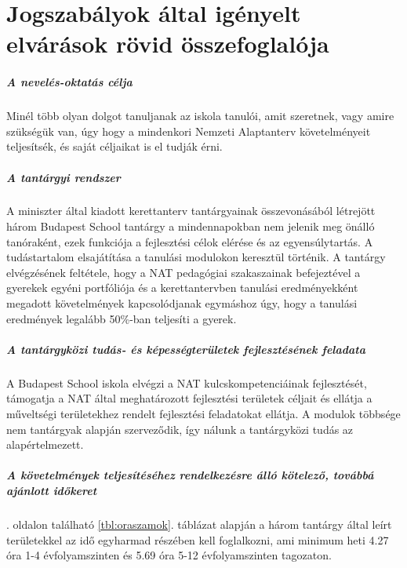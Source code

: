\chapter{Jogszabályok által igényelt elvárások rövid összefoglalója}
\label{sec:jogszabalyok}
\paragraph{A nevelés-oktatás célja}

Minél több olyan dolgot tanuljanak az iskola tanulói, amit szeretnek, vagy
amire szükségük van, úgy hogy a mindenkori Nemzeti Alaptanterv követelményeit
teljesítsék, és saját céljaikat is el tudják érni.

\paragraph{A tantárgyi rendszer}

A miniszter által kiadott kerettanterv tantárgyainak összevonásából létrejött
három Budapest School tantárgy a mindennapokban nem jelenik meg önálló
tanóraként, ezek funkciója a fejlesztési célok elérése és az egyensúlytartás. A
tudástartalom elsajátítása a tanulási modulokon keresztül történik. A tantárgy
elvégzésének feltétele, hogy a NAT pedagógiai szakaszainak befejeztével a
gyerekek egyéni portfóliója és a kerettantervben tanulási eredményekként
megadott követelmények kapcsolódjanak
egymáshoz úgy, hogy a tanulási eredmények legalább 50\%-ban teljesíti a gyerek.

\paragraph{A tantárgyközi tudás- és képességterületek fejlesztésének feladata}

A Budapest School iskola elvégzi a NAT kulcskompetenciáinak
fejlesztését, támogatja a NAT által meghatározott fejlesztési területek céljait
és ellátja a műveltségi területekhez rendelt fejlesztési feladatokat ellátja.
A modulok többsége nem tantárgyak alapján szerveződik, így nálunk a
tantárgyközi tudás az alapértelmezett.

\paragraph{A követelmények teljesítéséhez rendelkezésre álló kötelező, továbbá
    ajánlott időkeret}

. oldalon található \ref{tbl:oraszamok}. táblázat
alapján a három tantárgy által leírt területekkel az idő egyharmad részében
kell foglalkozni, ami minimum heti 4.27 óra 1-4 évfolyamszinten és 5.69 óra
5-12 évfolyamszinten
tagozaton.

